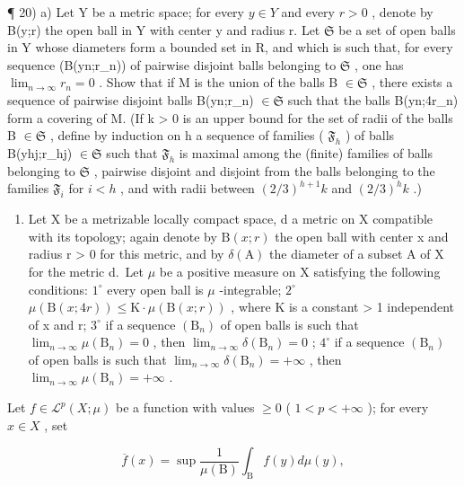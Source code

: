¶ 20) a) Let Y be a metric space; for every \(y \in Y\) and every \(r > 0\) , denote by B(y;r) the open ball in Y with center y and radius r. Let \(\mathfrak{S}\) be a set of open balls in Y whose diameters form a bounded set in R, and which is such that, for every sequence (B(yn;r\_n)) of pairwise disjoint balls belonging to \(\mathfrak{S}\) , one has \(\lim_{n \to \infty} r_n = 0\) . Show that if M is the union of the balls B \(\in \mathfrak{S}\) , there exists a sequence of pairwise disjoint balls B(yn;r\_n) \(\in \mathfrak{S}\) such that the balls B(yn;4r\_n) form a covering of M. (If k \textgreater{} 0 is an upper bound for the set of radii of the balls B \(\in \mathfrak{S}\) , define by induction on h a sequence of families ( \(\mathfrak{F}_h\) ) of balls B(yhj;r\_hj) \(\in \mathfrak{S}\) such that \(\mathfrak{F}_h\) is maximal among the (finite) families of balls belonging to \(\mathfrak{S}\) , pairwise disjoint and disjoint from the balls belonging to the families \(\mathfrak{F}_i\) for \(i < h\) , and with radii between \((2/3)^{h+1}k\) and \((2/3)^h k\) .)

\begin{enumerate}
\def\labelenumi{\alph{enumi})}
\setcounter{enumi}{1}
\tightlist
\item
  Let X be a metrizable locally compact space, d a metric on X compatible with its topology; again denote by \(\mathrm{B}(x;r)\) the open ball with center x and radius r \textgreater{} 0 for this metric, and by \(\delta(\mathrm{A})\) the diameter of a subset A of X for the metric d.~Let \(\mu\) be a positive measure on X satisfying the following conditions: \(1^{\circ}\) every open ball is \(\mu\) -integrable; \(2^{\circ}\) \(\mu(\mathrm{B}(x;4r)) \leqslant \mathrm{K} \cdot \mu(\mathrm{B}(x;r))\) , where K is a constant \textgreater{} 1 independent of x and r; \(3^{\circ}\) if a sequence \((\mathrm{B}_{n})\) of open balls is such that \(\lim_{n \to \infty} \mu(\mathrm{B}_{n}) = 0\) , then \(\lim_{n \to \infty} \delta(\mathrm{B}_{n}) = 0\) ; \(4^{\circ}\) if a sequence \((\mathrm{B}_{n})\) of open balls is such that \(\lim_{n \to \infty} \delta(\mathrm{B}_{n}) = +\infty\) , then \(\lim_{n \to \infty} \mu(\mathrm{B}_{n}) = +\infty\) .
\end{enumerate}

Let \(f \in \mathcal{L}^p(X; \mu)\) be a function with values \(\geqslant 0\) ( \(1 < p < +\infty\) ); for every \(x \in X\) , set

\[
\overline {{{{f}}}} (x) = \sup \frac {1}{\mu (\mathrm{B})} \int_ {\mathrm{B}} f (y) d \mu (y),
\]

